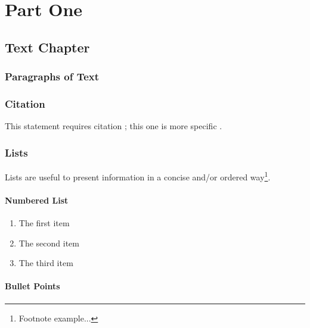 \documentclass[11pt,fleqn]{book}
\begin{document}
\part{Part One}

\chapter{Text Chapter}

\section{Paragraphs of Text}

\lipsum[1-7] %


\section{Citation}

This statement requires citation \cite{article_key}; this one is more specific \cite[162]{book_key}.


\section{Lists}

Lists are useful to present information in a concise and/or ordered way\footnote{Footnote example...}.

\subsection{Numbered List}

\begin{enumerate}
\item The first item
\item The second item
\item The third item
\end{enumerate}

\subsection{Bullet Points}
\end{document}
